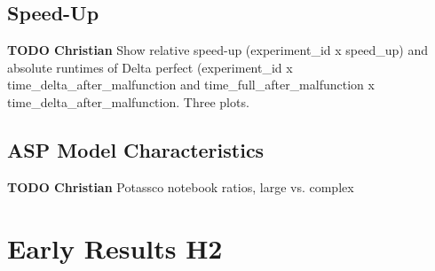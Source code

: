 \documentclass{article}
\begin{document}
\subsection{Speed-Up}

\begin{mdframed}
{\bf TODO Christian} Show relative speed-up (experiment\_id x speed\_up) and absolute runtimes of Delta perfect (experiment\_id x time\_delta\_after\_malfunction and time\_full\_after\_malfunction x time\_delta\_after\_malfunction. Three plots.
\end{mdframed}




\subsection{ASP Model Characteristics}

\begin{mdframed}
{\bf TODO Christian} Potassco notebook ratios, large vs. complex
\end{mdframed}


\section{Early Results H2}





\end{document}
